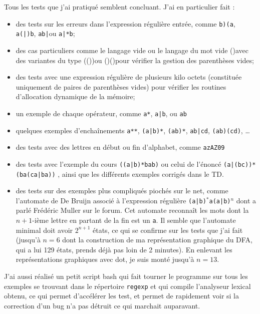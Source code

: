 \documentclass[12pt, a4paper]{article}
\begin{document}
Tous les tests que j'ai pratiqué semblent concluant. J'ai en particulier fait :
\begin{itemize}
\item des tests sur les erreurs dans l'expression régulière entrée, comme \og\texttt{b)(a}\fg, \og\texttt{a(|)b}\fg, \og\texttt{ab|}\fg ou \og\texttt{a|*b}\fg;
\item des cas particuliers comme le langage vide \og \fg{} ou le langage du mot vide \og()\fg avec des variantes du type \og(())\fg ou \og()()\fg pour vérifier la gestion des parenthèses vides;
\item des tests avec une expression régulière de plusieurs kilo octets (constituée uniquement de paires de parenthèses vides) pour vérifier les routines d'allocation dynamique de la mémoire;
\item un exemple de chaque opérateur, comme \og\texttt{a*}\fg, \og\texttt{a|b}\fg, ou \og\texttt{ab}\fg
\item quelques exemples d'enchaînements \og\texttt{a**}\fg, \og\texttt{(a|b)*}\fg, \texttt{(ab)*}, \og\texttt{ab|cd}\fg, \og\texttt{(ab)(cd)}\fg, \dots
\item des tests avec des lettres en début ou fin d'alphabet, comme \og\texttt{azAZ09}\fg
\item des tests avec l'exemple du cours \og \texttt{((a|b)*bab)} \fg{} ou celui de l'énoncé \og \texttt{(a|(bc))*(ba(ca|ba))} \fg{}, ainsi que les différents exemples corrigés dans le TD.
\item des tests sur des exemples plus compliqués piochés sur le net, comme l'automate de De Bruijn associé à l'expression régulière \og \texttt{(a|b)$^*$a(a|b)$^n$} \fg{} dont a parlé Frédéric Muller sur le forum. Cet automate  reconnaît les mots dont la $n+1$-ième lettre en partant de la fin est un \texttt{a}. Il semble que l'automate minimal doit avoir $2^{n+1}$ états, ce qui se confirme sur les tests que j'ai fait (jusqu'à $n=6$ dont la construction de ma représentation graphique du DFA, qui a lui 129 états, prends déjà pas loin de 2 minutes). En enlevant les représentations graphiques avec dot, je suis monté jusqu'à $n=13$.

\end{itemize}

J'ai aussi réalisé un petit script bash qui fait tourner le programme sur tous les exemples se trouvant dans le répertoire \texttt{regexp} et qui compile l'analyseur lexical obtenu, ce qui permet d’accélérer les test, et permet de rapidement voir si la correction d'un bug n'a pas détruit ce qui marchait auparavant.
\end{document}
